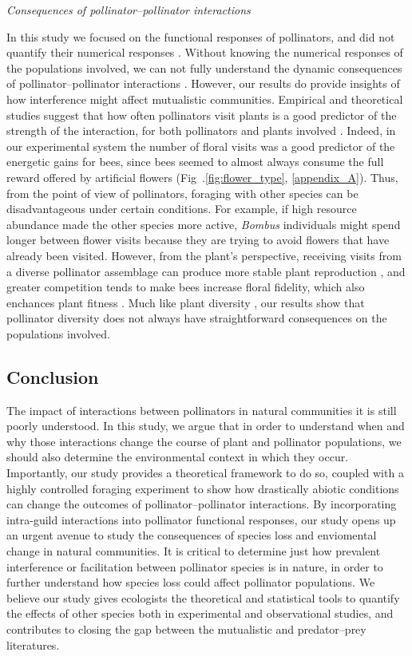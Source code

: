 \begin{refsection}
\textit{Consequences of pollinator--pollinator interactions}

In this study we focused on the functional responses of pollinators, and did not quantify their numerical responses \citep{morris_benefit_2010}. Without knowing the numerical responses of the populations involved, we can not fully understand the dynamic consequences of pollinator--pollinator interactions \citep{revilla2015numerical}. However, our results do provide insights of how interference might affect mutualistic communities. Empirical and theoretical studies suggest that how often pollinators visit plants is a good predictor of the strength of the interaction, for both pollinators and plants involved \citep{vazquez_interaction_2005,vazquez_strength_2012}. Indeed, in our experimental system the number of floral visits was a good predictor of the energetic gains for bees, since bees seemed to almost always consume the full reward offered by artificial flowers (Fig~.\ref{fig:flower_type}, \autoref{appendix_A}). Thus, from the point of view of pollinators, foraging with other species can be disadvantageous under certain conditions. For example, if high resource abundance made the other species more active, \textit{Bombus} individuals might spend longer between flower visits because they are trying to avoid flowers that have already been visited. However, from the plant's perspective, receiving visits from a diverse pollinator assemblage can produce more stable plant reproduction \citep{sahli2006characterizing}, and greater competition tends to make bees increase floral fidelity, which also enchances plant fitness \citep{brosi_single_2013}. Much like plant diversity \citep{bruninga2016role}, our results show that pollinator diversity does not always have straightforward consequences on the populations involved.


\subsection*{Conclusion}

The impact of interactions between pollinators in natural communities it is still poorly understood. In this study, we argue that in order to understand when and why those interactions change the course of plant and pollinator populations, we should also determine the environmental context in which they occur. Importantly, our study provides a theoretical framework to do so, coupled with a highly controlled foraging experiment to show how drastically abiotic conditions can change the outcomes of pollinator--pollinator interactions. By incorporating intra-guild interactions into pollinator functional responses, our study opens up an urgent avenue to study the consequences of species loss and enviomental change in natural communities. It is critical to determine just how prevalent interference or facilitation between pollinator species is in nature, in order to further understand how species loss could affect pollinator populations. We believe our study gives ecologists the theoretical and statistical tools to quantify the effects of other species both in experimental and observational studies, and contributes to closing the gap between the mutualistic and predator--prey literatures.



\end{refsection}
